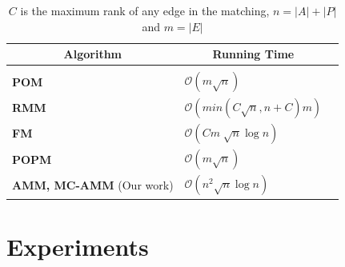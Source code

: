 \documentclass[letterpaper]{article} %
\newtheorem*{theorem}{Theorem}
\begin{document}





\begin{table}[h]
\small
\begin{center}
\begin{tabular}{lll}
\multicolumn{1}{c}{\bf Algorithm}
&\multicolumn{1}{c}{\bf Running Time}
\\ \hline  \\
\textbf{POM}  \cite{pareto} & $\mathcal{O}(m\sqrt{n})$\\
\textbf{RMM} \cite{irving2004rank} & $\mathcal{O}(min(C\sqrt{n}, n+C)m)$\\
\textbf{FM}  \cite{fair} & ${\mathcal{O}}(Cm\sqrt[]{n}\log n)$\\
\textbf{POPM}  \cite{pop-bounded} & $\mathcal{O}(m\sqrt{n})$\\
\textbf{AMM, MC-AMM} (Our work) & ${\mathcal{O}}(n^2\sqrt{n}\log n)$\\
\end{tabular}
\end{center}
\caption{$C$ is the maximum rank of any edge in the matching, $n=|A|+|P|$ and $m=|E|$}
\label{tab:algorithms}
\end{table}



\section{Experiments}
\end{document}
